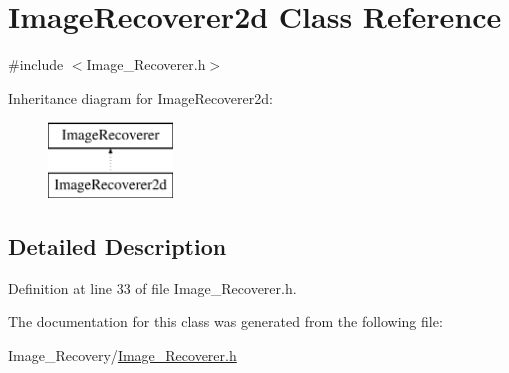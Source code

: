\hypertarget{class_image_recoverer2d}{}\section{Image\+Recoverer2d Class Reference}
\label{class_image_recoverer2d}


{\ttfamily \#include $<$Image\+\_\+\+Recoverer.\+h$>$}

Inheritance diagram for Image\+Recoverer2d\+:\begin{figure}[H]
\begin{center}
\leavevmode
\includegraphics[height=2.000000cm]{class_image_recoverer2d}
\end{center}
\end{figure}


\subsection{Detailed Description}


Definition at line 33 of file Image\+\_\+\+Recoverer.\+h.



The documentation for this class was generated from the following file\+:\begin{DoxyCompactItemize}
\item 
Image\+\_\+\+Recovery/\hyperlink{_image___recoverer_8h}{Image\+\_\+\+Recoverer.\+h}\end{DoxyCompactItemize}
